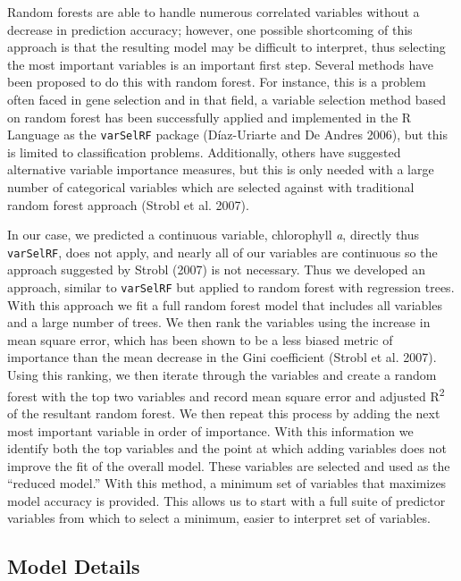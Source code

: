 \documentclass[12pt,]{article}
\begin{document}
Random forests are able to handle numerous correlated variables without
a decrease in prediction accuracy; however, one possible shortcoming of
this approach is that the resulting model may be difficult to interpret,
thus selecting the most important variables is an important first step.
Several methods have been proposed to do this with random forest. For
instance, this is a problem often faced in gene selection and in that
field, a variable selection method based on random forest has been
successfully applied and implemented in the R Language as the
\texttt{varSelRF} package (D{í}az-Uriarte and De Andres 2006), but this
is limited to classification problems. Additionally, others have
suggested alternative variable importance measures, but this is only
needed with a large number of categorical variables which are selected
against with traditional random forest approach (Strobl et al. 2007).

In our case, we predicted a continuous variable, chlorophyll \emph{a},
directly thus \texttt{varSelRF}, does not apply, and nearly all of our
variables are continuous so the approach suggested by Strobl (2007) is
not necessary. Thus we developed an approach, similar to
\texttt{varSelRF} but applied to random forest with regression trees.
With this approach we fit a full random forest model that includes all
variables and a large number of trees. We then rank the variables using
the increase in mean square error, which has been shown to be a less
biased metric of importance than the mean decrease in the Gini
coefficient (Strobl et al. 2007). Using this ranking, we then iterate
through the variables and create a random forest with the top two
variables and record mean square error and adjusted R\textsuperscript{2}
of the resultant random forest. We then repeat this process by adding
the next most important variable in order of importance. With this
information we identify both the top variables and the point at which
adding variables does not improve the fit of the overall model. These
variables are selected and used as the ``reduced model.'' With this
method, a minimum set of variables that maximizes model accuracy is
provided. This allows us to start with a full suite of predictor
variables from which to select a minimum, easier to interpret set of
variables.

\subsection{Model Details}\label{model-details}
\end{document}
